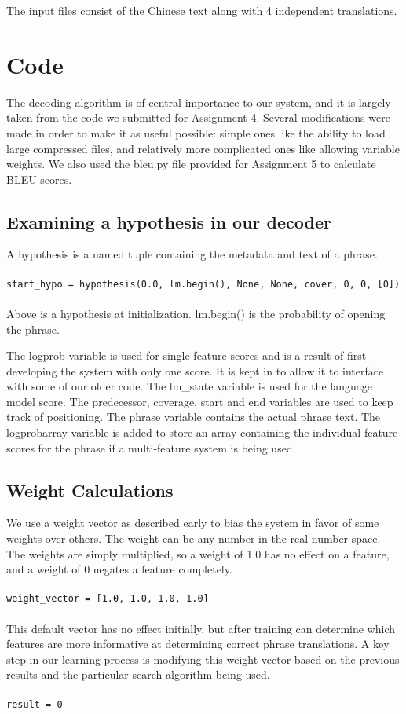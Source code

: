 \documentclass[11pt,letterpaper]{article}
\begin{document}
The input files consist of the Chinese text along with 4 independent translations.

\section{Code}

The decoding algorithm is of central importance to our system, and it is largely taken from the code we submitted for Assignment 4. Several modifications were made in order to make it as useful possible: simple ones like the ability to load large compressed files, and relatively more complicated ones like allowing variable weights. We also used the bleu.py file provided for Assignment 5 to calculate BLEU scores.

\subsection{Examining a hypothesis in our decoder}

A hypothesis is a named tuple containing the metadata and text of a phrase. 
\\ \\
\noindent\texttt{\scriptsize{start\_hypo = hypothesis(0.0, lm.begin(), None, None, cover, 0, 0, [0])}}
\\ \\
Above is a hypothesis at initialization. lm.begin() is the probability of opening the phrase.

The logprob variable is used for single feature scores and is a result of first developing the system with only one score. It is kept in to allow it to interface with some of our older code. The lm\_state variable is used for the language model score. The predecessor, coverage, start and end variables are used to keep track of positioning. The phrase variable contains the actual phrase text. The logprobarray variable is added to store an array containing the individual feature scores for the phrase if a multi-feature system is being used.

\subsection{Weight Calculations}

We use a weight vector as described early to bias the system in favor of some weights over others. The weight can be any number in the real number space. The weights are simply multiplied, so a weight of 1.0 has no effect on a feature, and a weight of 0 negates a feature completely.
\\ \\
\noindent\texttt{\scriptsize{weight\_vector = [1.0, 1.0, 1.0, 1.0]}}
\\ \\
This default vector has no effect initially, but after training can determine which features are more informative at determining correct phrase translations. A key step in our learning process is modifying this weight vector based on the previous results and the particular search algorithm being used.
\\ \\
\noindent\texttt{\scriptsize{result = 0}}
\end{document}
